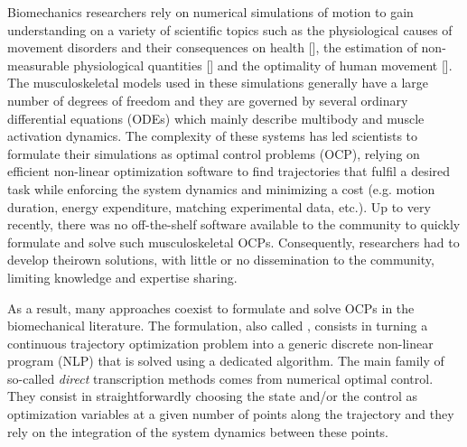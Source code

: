 Biomechanics researchers rely on numerical simulations of motion to gain understanding on a variety of scientific topics such as the physiological causes of movement disorders and their consequences on health [\addref], the estimation of non-measurable physiological quantities [\addref] and the optimality of human movement [\addref].
The musculoskeletal models used in these simulations generally have a large number of degrees of freedom and they are governed by several ordinary differential equations (ODEs) which mainly describe multibody and muscle activation dynamics.
The complexity of these systems has led scientists to formulate their simulations as optimal control problems (OCP), relying on efficient non-linear optimization software to find trajectories that fulfil a desired task while enforcing the system dynamics and minimizing a cost (e.g. motion duration, energy expenditure, matching experimental data, etc.).
Up to very recently, there was no off-the-shelf software available to the community to quickly formulate and solve such musculoskeletal OCPs. 
Consequently, researchers had to develop theirown solutions, with little or no dissemination to the community, limiting knowledge and expertise sharing.


As a result, many approaches coexist to formulate and solve OCPs in the biomechanical literature. 
The formulation, also called , consists in turning a continuous trajectory optimization problem into a generic discrete non-linear program (NLP) that is solved using a dedicated algorithm. 
The main family of so-called \textit{direct} transcription methods comes from numerical optimal control. 
They consist in straightforwardly choosing the state and/or the control as optimization variables at a given number of points along the trajectory and they rely on the integration of the system dynamics between these points. 

